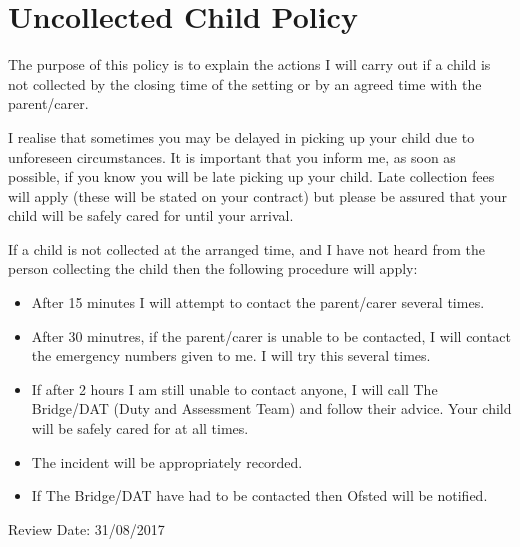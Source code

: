 

\section{Uncollected Child Policy}

The purpose of this policy is to explain the actions I will carry out if
a child is not collected by the closing time of the setting or by an
agreed time with the parent/carer.

I realise that sometimes you may be delayed in picking up your child due
to unforeseen circumstances. It is important that you inform me, as soon
as possible, if you know you will be late picking up your child. Late
collection fees will apply (these will be stated on your contract) but
please be assured that your child will be safely cared for until your
arrival.

If a child is not collected at the arranged time, and I have not heard
from the person collecting the child then the following procedure will
apply:

\begin{itemize}
\item
  After 15 minutes I will attempt to contact the parent/carer several
  times.
\item
  After 30 minutres, if the parent/carer is unable to be contacted, I
  will contact the emergency numbers given to me. I will try this
  several times.
\item
  If after 2 hours I am still unable to contact anyone, I will call
  The Bridge/DAT (Duty and Assessment Team) and follow their advice. Your
  child will be safely cared for at all times.
\item
  The incident will be appropriately recorded.
\item
  If The Bridge/DAT have had to be contacted then Ofsted will be notified.
\end{itemize}

Review Date: 31/08/2017


